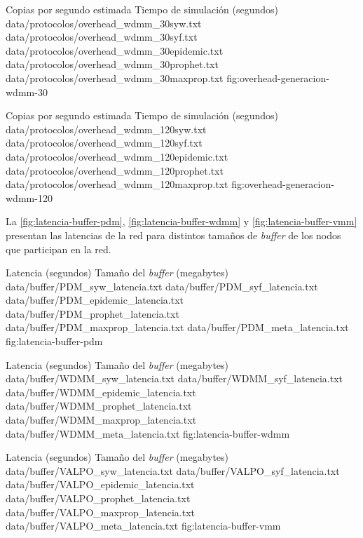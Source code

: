 {
\graficoEstimacio
{Copias por segundo estimada}
{Tiempo de simulación (segundos)}
{data/protocolos/overhead_wdmm_30syw.txt}
{data/protocolos/overhead_wdmm_30syf.txt}
{data/protocolos/overhead_wdmm_30epidemic.txt}
{data/protocolos/overhead_wdmm_30prophet.txt}
{data/protocolos/overhead_wdmm_30maxprop.txt}
}{fig:overhead-generacion-wdmm-30}


{
\graficoEstimacio
{Copias por segundo estimada}
{Tiempo de simulación (segundos)}
{data/protocolos/overhead_wdmm_120syw.txt}
{data/protocolos/overhead_wdmm_120syf.txt}
{data/protocolos/overhead_wdmm_120epidemic.txt}
{data/protocolos/overhead_wdmm_120prophet.txt}
{data/protocolos/overhead_wdmm_120maxprop.txt}
}{fig:overhead-generacion-wdmm-120}






La \ref{fig:latencia-buffer-pdm},
\ref{fig:latencia-buffer-wdmm} y 
\ref{fig:latencia-buffer-vmm} presentan las latencias de la red para distintos
tamaños de \textit{buffer} de los nodos que participan en la red.



{
\graficoProtocolos
{Latencia (segundos)}
{Tamaño del \textit{buffer} (megabytes)}
{data/buffer/PDM_syw_latencia.txt}
{data/buffer/PDM_syf_latencia.txt}
{data/buffer/PDM_epidemic_latencia.txt}
{data/buffer/PDM_prophet_latencia.txt}
{data/buffer/PDM_maxprop_latencia.txt}
{data/buffer/PDM_meta_latencia.txt}
}{fig:latencia-buffer-pdm}


{
\graficoProtocolos
{Latencia (segundos)}
{Tamaño del \textit{buffer} (megabytes)}
{data/buffer/WDMM_syw_latencia.txt}
{data/buffer/WDMM_syf_latencia.txt}
{data/buffer/WDMM_epidemic_latencia.txt}
{data/buffer/WDMM_prophet_latencia.txt}
{data/buffer/WDMM_maxprop_latencia.txt}
{data/buffer/WDMM_meta_latencia.txt}
}{fig:latencia-buffer-wdmm}


{
\graficoProtocolos
{Latencia (segundos)}
{Tamaño del \textit{buffer} (megabytes)}
{data/buffer/VALPO_syw_latencia.txt}
{data/buffer/VALPO_syf_latencia.txt}
{data/buffer/VALPO_epidemic_latencia.txt}
{data/buffer/VALPO_prophet_latencia.txt}
{data/buffer/VALPO_maxprop_latencia.txt}
{data/buffer/VALPO_meta_latencia.txt}
}{fig:latencia-buffer-vmm}

